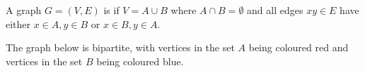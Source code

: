 \documentclass[a4paper]{scrartcl}
\begin{document}
\begin{definition}
	A graph $G = (V, E)$ is  if $V = A \cup B$ where $A \cap B = \emptyset$ and all edges $xy \in E$ have either $x \in A, y \in B$ or $x \in B, y \in A$.
\end{definition}

\begin{example}
	The graph below is bipartite, with vertices in the set $A$ being coloured red and vertices in the set $B$ being coloured blue.
	\begin{center}
		


\begin{tikzpicture}[x=0.75pt,y=0.75pt,yscale=-1,xscale=1]


\end{tikzpicture}
\end{center}
\end{example}
\end{document}
